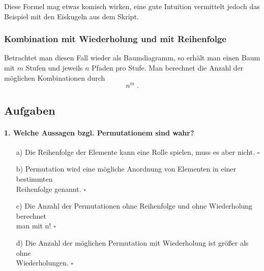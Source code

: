 \documentclass[a4paper]{article}
\newcommand\dangersign[1][2ex]{%
  \renewcommand\stacktype{L}%
  \scaleto{\stackon[1.3pt]{\color{red}$\triangle$}{\tiny !}}{#1}%
}
\begin{document}
\noindent \dangersign[3ex] Diese Formel mag etwas komisch wirken, eine gute Intuition vermittelt jedoch das Beispiel mit den Eiskugeln aus dem Skript.

\subsubsection{Kombination mit Wiederholung und mit Reihenfolge}
Betrachtet man diesen Fall wieder als Baumdiagramm, so erhält man einen Baum mit $m$ Stufen und jeweils $n$ Pfaden pro Stufe. Man berechnet die Anzahl der möglichen Kombinationen durch $$n^m\;.$$

\clearpage

\subsection{Aufgaben}
\paragraph{1. Welche Aussagen bzgl. Permutationem sind wahr?}
\begin{itemize}
    \item[a)]  Die Reihenfolge der Elemente kann eine Rolle spielen, muss es aber nicht. \hfill $\square$
    \item[b)] Permutation wird eine mögliche Anordnung von Elementen in einer bestimmten\\ Reihenfolge genannt.  \hfill $\square$
    \item[c)] Die Anzahl der Permutationen ohne Reihenfolge und ohne Wiederholung berechnet\\ man mit n! \hfill $\square$
    \item[d)] Die Anzahl der möglichen Permutation mit Wiederholung ist größer als ohne\\ Wiederholungen. \hfill $\square$
\end{itemize}
\end{document}
